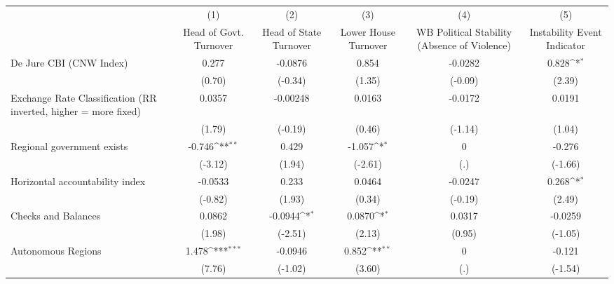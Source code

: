 {
\def\sym#1{\ifmmode^{#1}\else\(^{#1}\)\fi}
\begin{tabular*}{\linewidth}{@{\hskip\tabcolsep\extracolsep\fill}l*{5}{c}}
\toprule
                &\multicolumn{1}{c}{(1)}&\multicolumn{1}{c}{(2)}&\multicolumn{1}{c}{(3)}&\multicolumn{1}{c}{(4)}&\multicolumn{1}{c}{(5)}\\
                &\multicolumn{1}{c}{Head of Govt. Turnover}&\multicolumn{1}{c}{Head of State Turnover}&\multicolumn{1}{c}{Lower House Turnover}&\multicolumn{1}{c}{WB Political Stability (Absence of Violence)}&\multicolumn{1}{c}{Instability Event Indicator}\\
\midrule
De Jure CBI (CNW Index)&    0.277         &  -0.0876         &    0.854         &  -0.0282         &    0.828\sym{*}  \\
                &   (0.70)         &  (-0.34)         &   (1.35)         &  (-0.09)         &   (2.39)         \\
\addlinespace
Exchange Rate Classification (RR inverted, higher = more fixed)&   0.0357         & -0.00248         &   0.0163         &  -0.0172         &   0.0191         \\
                &   (1.79)         &  (-0.19)         &   (0.46)         &  (-1.14)         &   (1.04)         \\
\addlinespace
Regional government exists   &   -0.746\sym{**} &    0.429         &   -1.057\sym{*}  &        0         &   -0.276         \\
                &  (-3.12)         &   (1.94)         &  (-2.61)         &      (.)         &  (-1.66)         \\
\addlinespace
Horizontal accountability index&  -0.0533         &    0.233         &   0.0464         &  -0.0247         &    0.268\sym{*}  \\
                &  (-0.82)         &   (1.93)         &   (0.34)         &  (-0.19)         &   (2.49)         \\
\addlinespace
Checks and Balances&   0.0862         &  -0.0944\sym{*}  &   0.0870\sym{*}  &   0.0317         &  -0.0259         \\
                &   (1.98)         &  (-2.51)         &   (2.13)         &   (0.95)         &  (-1.05)         \\
\addlinespace
Autonomous Regions&    1.478\sym{***}&  -0.0946         &    0.852\sym{**} &        0         &   -0.121         \\
                &   (7.76)         &  (-1.02)         &   (3.60)         &      (.)         &  (-1.54)         \\

\end{tabular*}}
